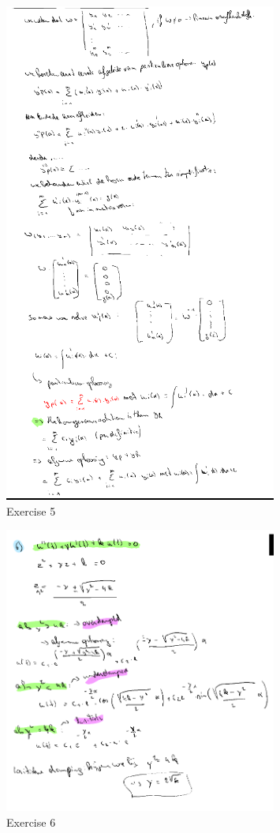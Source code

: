 \documentclass[a4paper]{report}
\begin{document}
\begin{figure}[H]
	\centering
	\includegraphics[width=0.8\textwidth]{assets/exercise_5_huis_8.png}
	\caption{Exercise 5}
	\label{fig:exercise_5_huis_8}
\end{figure}


\begin{figure}[H]
	\centering
	\includegraphics[width=0.8\textwidth]{assets/exercise_6_huis_8.png}
	\caption{Exercise 6}
	\label{fig:exercise_6_huis_8}
\end{figure}
\end{document}
